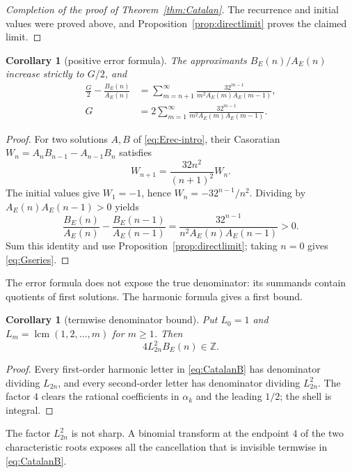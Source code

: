 \documentclass[11pt]{article}
\newtheorem{corollary}[theorem]{Corollary}
\theoremstyle{definition}
\theoremstyle{remark}
\newcommand{\Z}{\mathbb Z}
\begin{document}
\begin{proof}[Completion of the proof of Theorem~\ref{thm:Catalan}]
The recurrence and initial values were proved above, and
Proposition~\ref{prop:directlimit} proves the claimed limit.
\end{proof}

\begin{corollary}[positive error formula]\label{cor:Catalanerror}
The approximants $B_E(n)/A_E(n)$ increase strictly to $G/2$, and
\begin{align}
 \frac G2-\frac{B_E(n)}{A_E(n)}
 &=\sum_{m=n+1}^{\infty}
   \frac{32^{m-1}}{m^2A_E(m)A_E(m-1)},\label{eq:errorseries}\\
 G&=2\sum_{m=1}^{\infty}
   \frac{32^{m-1}}{m^2A_E(m)A_E(m-1)}.\label{eq:Gseries}
\end{align}
\end{corollary}

\begin{proof}
For two solutions $A,B$ of \eqref{eq:Erec-intro}, their Casoratian
$W_n=A_nB_{n-1}-A_{n-1}B_n$ satisfies
\[
 W_{n+1}=\frac{32n^2}{(n+1)^2}W_n.
\]
The initial values give $W_1=-1$, hence $W_n=-32^{n-1}/n^2$.  Dividing by
$A_E(n)A_E(n-1)>0$ yields
\[
 \frac{B_E(n)}{A_E(n)}-\frac{B_E(n-1)}{A_E(n-1)}
 =\frac{32^{n-1}}{n^2A_E(n)A_E(n-1)}>0.
\]
Sum this identity and use Proposition~\ref{prop:directlimit}; taking $n=0$ gives
\eqref{eq:Gseries}.
\end{proof}

The error formula does not expose the true denominator: its summands contain quotients
of first solutions.  The harmonic formula gives a first bound.

\begin{corollary}[termwise denominator bound]\label{cor:Catalanden}
Put $L_0=1$ and $L_m=\operatorname{lcm}(1,2,\ldots,m)$ for $m\ge1$.  Then
\begin{equation}\label{eq:denbound}
 4L_{2n}^2B_E(n)\in\Z.
\end{equation}
\end{corollary}

\begin{proof}
Every first-order harmonic letter in \eqref{eq:CatalanB} has denominator dividing
$L_{2n}$, and every second-order letter has denominator dividing $L_{2n}^2$.
The factor $4$ clears the rational coefficients in $\alpha_k$ and the leading $1/2$;
the shell is integral.
\end{proof}

The factor $L_{2n}^2$ is not sharp.  A binomial transform at the endpoint $4$ of the
two characteristic roots exposes all the cancellation that is invisible termwise in
\eqref{eq:CatalanB}.
\end{document}
